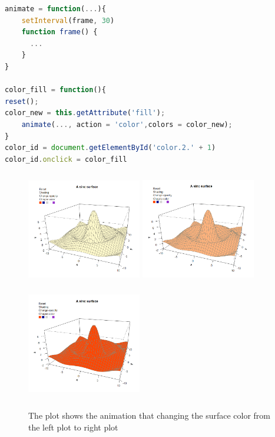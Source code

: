\documentclass[11pt,twoside]{report}
\begin{document}
\begin{lstlisting}[language = JavaScript]
animate = function(...){
    setInterval(frame, 30)
    function frame() {
      ...
    }
}

color_fill = function(){
reset();
color_new = this.getAttribute('fill');
    animate(..., action = 'color',colors = color_new);
}
color_id = document.getElementById('color.2.' + 1)
color_id.onclick = color_fill
\end{lstlisting}


\begin{figure}[h]
	\begin{center}
		\includegraphics[height = 5cm, width = 5cm]{figure/svg/origin_1.PNG}
		\includegraphics[height = 5cm, width = 5cm]{figure/svg/change_2.PNG}
		\includegraphics[height = 5cm, width = 5cm]{figure/svg/change_3.PNG}
		\caption{The plot shows the animation that changing the surface color from the left plot to right plot}
		\label{Example_6.3.1}
	\end{center}
\end{figure}
\end{document}
